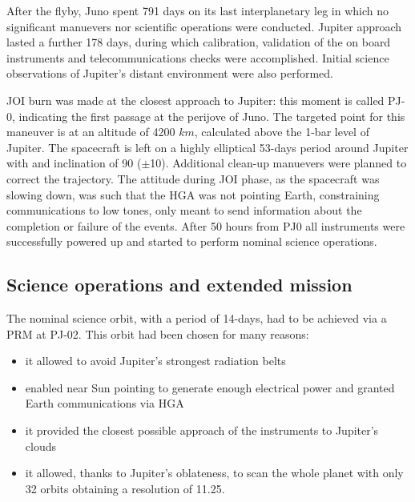 After the flyby, Juno spent 791 days on its last interplanetary leg in which no significant manuevers nor scientific operations were conducted. Jupiter approach lasted a further 178 days, during which calibration, validation of the on board instruments and telecommunications checks were accomplished. Initial science observations of Jupiter's distant environment were also performed. 


JOI burn was made at the closest approach to Jupiter: this moment is called PJ-0, indicating the first passage at the perijove of Juno. The targeted point for this maneuver is at an altitude of 4200 $km$, calculated above the 1-bar level of Jupiter. The spacecraft is left on a highly elliptical 53-days period around Jupiter with and inclination of 90\textdegree \; ($\pm$10\textdegree). Additional clean-up manuevers were planned to correct the trajectory. The attitude during JOI phase, as the spacecraft was slowing down, was such that the HGA was not pointing Earth, constraining communications to low tones, only meant to send information about the completion or failure of the events. 
After 50 hours from PJ0 all instruments were successfully powered up and started to perform nominal science operations. \cite{look_inside_juno_mission}

\subsection{Science operations and extended mission} 
\label{sec: science ops}


The nominal science orbit, with a period of 14-days, had to be achieved via a PRM at PJ-02.  This orbit had been chosen for many reasons: 

\begin{itemize}
    \item it allowed to avoid Jupiter's strongest radiation belts
    \item enabled near Sun pointing to generate enough electrical power and granted Earth communications via HGA
    \item it provided the closest possible approach of the instruments to Jupiter's clouds 
    \item it allowed, thanks to Jupiter's oblateness, to scan the whole planet with only 32 orbits obtaining a resolution of 11.25\textdegree.
\end{itemize}

